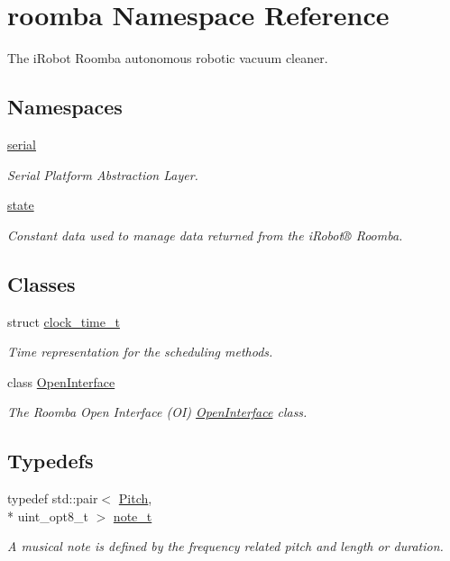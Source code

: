 \hypertarget{namespaceroomba}{\section{roomba Namespace Reference}
\label{namespaceroomba}
}


The i\+Robot Roomba autonomous robotic vacuum cleaner.  


\subsection*{Namespaces}
\begin{DoxyCompactItemize}
\item 
 \hyperlink{namespaceroomba_1_1serial}{serial}
\begin{DoxyCompactList}\small\item\em Serial Platform Abstraction Layer. \end{DoxyCompactList}\item 
 \hyperlink{namespaceroomba_1_1state}{state}
\begin{DoxyCompactList}\small\item\em Constant data used to manage data returned from the i\+Robot® Roomba. \end{DoxyCompactList}\end{DoxyCompactItemize}
\subsection*{Classes}
\begin{DoxyCompactItemize}
\item 
struct \hyperlink{structroomba_1_1clock__time__t}{clock\+\_\+time\+\_\+t}
\begin{DoxyCompactList}\small\item\em Time representation for the scheduling methods. \end{DoxyCompactList}\item 
class \hyperlink{classroomba_1_1_open_interface}{Open\+Interface}
\begin{DoxyCompactList}\small\item\em The Roomba Open Interface (O\+I) \hyperlink{classroomba_1_1_open_interface}{Open\+Interface} class. \end{DoxyCompactList}\end{DoxyCompactItemize}
\subsection*{Typedefs}
\begin{DoxyCompactItemize}
\item 
typedef std\+::pair$<$ \hyperlink{namespaceroomba_aa553ae759298da7895bffd70162d9479}{Pitch}, \\*
uint\+\_\+opt8\+\_\+t $>$ \hyperlink{namespaceroomba_a19e8ac8a2208a1a44fa9273930cf7451}{note\+\_\+t}
\begin{DoxyCompactList}\small\item\em A musical note is defined by the frequency related pitch and length or duration. \end{DoxyCompactList}\end{DoxyCompactItemize}
